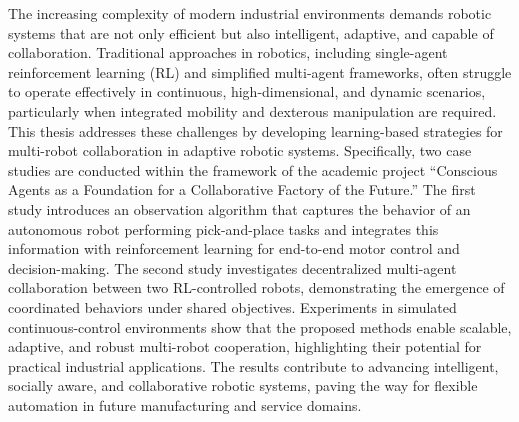 \documentclass[english, 12pt, a4paper, elec, utf8, a-2b, online]{aaltothesis}
\date{10 October 2025}
\begin{document}
\makecoverpage

\makecopyrightpage

\clearpage

\begin{abstractpage}[english]
The increasing complexity of modern industrial environments demands robotic systems that are not only efficient but also intelligent, adaptive, and capable of collaboration. Traditional approaches in robotics, including single-agent reinforcement learning (RL) and simplified multi-agent frameworks, often struggle to operate effectively in continuous, high-dimensional, and dynamic scenarios, particularly when integrated mobility and dexterous manipulation are required. This thesis addresses these challenges by developing learning-based strategies for multi-robot collaboration in adaptive robotic systems. Specifically, two case studies are conducted within the framework of the academic project ``Conscious Agents as a Foundation for a Collaborative Factory of the Future.'' The first study introduces an observation algorithm that captures the behavior of an autonomous robot performing pick-and-place tasks and integrates this information with reinforcement learning for end-to-end motor control and decision-making. The second study investigates decentralized multi-agent collaboration between two RL-controlled robots, demonstrating the emergence of coordinated behaviors under shared objectives. Experiments in simulated continuous-control environments show that the proposed methods enable scalable, adaptive, and robust multi-robot cooperation, highlighting their potential for practical industrial applications. The results contribute to advancing intelligent, socially aware, and collaborative robotic systems, paving the way for flexible automation in future manufacturing and service domains.
\end{abstractpage}
\end{document}
